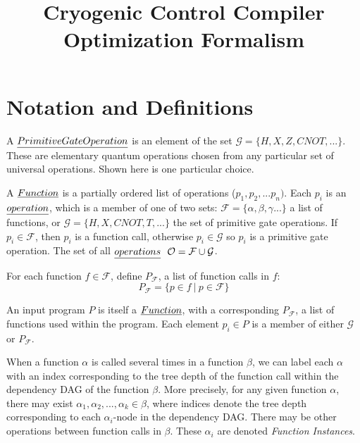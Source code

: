 \documentclass[12pt,twoside]{article}
\begin{document}
\title{Cryogenic Control Compiler Optimization Formalism}


\maketitle

\section{Notation and Definitions}
\begin{definition} A $\emph{Primitive Gate Operation}$ is an element of the set $\mathcal{G} = \{H, X, Z, CNOT, ...\}$. These are elementary quantum operations chosen from any particular set of universal operations. Shown here is one particular choice.
\end{definition}

\begin{definition} A $\emph{Function}$ is a partially ordered list of operations ($p_1, p_2, ... p_n)$. Each $p_i$ is an $\emph{operation}$, which is a member of one of two sets: $\mathcal{F} = \{\alpha, \beta, \gamma ... \}$ a list of functions, or $\mathcal{G} = \{H, X, CNOT, T, ... \}$ the set of primitive gate operations. If $p_i \in \mathcal{F}$, then $p_i$ is a function call, otherwise $p_i \in \mathcal{G}$ so $p_i$ is a primitive gate operation. The set of all $\emph{operations}\ \  \mathcal{O} = \mathcal{F} \cup \mathcal{G}$.
\end{definition}
\begin{definition} For each function $f \in \mathcal{F}$, define $P_{\mathcal{F}}$, a list of function calls in $f$:
	\begin{equation}
		P_{\mathcal{F}} = \{p \in f\ |\ p \in \mathcal{F}\}
	\end{equation}
\end{definition}


\begin{definition} An input program $P$ is itself a $\emph{Function}$, with a corresponding $P_{\mathcal{F}}$, a list of functions used within the program. Each element $p_i \in P$ is a member of either $\mathcal{G}$ or $P_{\mathcal{F}}$. 
\end{definition}

\begin{definition} When a function $\alpha$ is called several times in a function $\beta$, we can label each $\alpha$ with an index corresponding to the tree depth of the function call within the dependency DAG of the function $\beta$. More precisely, for any given function $\alpha$, there may exist $\alpha_1, \alpha_2, ... , \alpha_k \in \beta$, where indices denote the tree depth corresponding to each $\alpha_i$-node in the dependency DAG. There may be other operations between function calls in $\beta$. These $\alpha_i$ are denoted \emph{Function Instances}. 
\end{definition}
\end{document}
